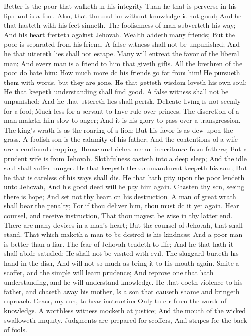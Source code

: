 Better is the poor that walketh in his integrity Than he that is perverse in his lips and is a fool.  Also, that the soul be without knowledge is not good; And he that hasteth with his feet sinneth.  The foolishness of man subverteth his way; And his heart fretteth against Jehovah.  Wealth addeth many friends; But the poor is separated from his friend.  A false witness shall not be unpunished; And he that uttereth lies shall not escape.  Many will entreat the favor of the liberal man; And every man is a friend to him that giveth gifts.  All the brethren of the poor do hate him: How much more do his friends go far from him! He pursueth them with words, but they are gone.  He that getteth wisdom loveth his own soul: He that keepeth understanding shall find good.  A false witness shall not be unpunished; And he that uttereth lies shall perish.  Delicate living is not seemly for a fool; Much less for a servant to have rule over princes.  The discretion of a man maketh him slow to anger; And it is his glory to pass over a transgression.  The king’s wrath is as the roaring of a lion; But his favor is as dew upon the grass.  A foolish son is the calamity of his father; And the contentions of a wife are a continual dropping.  House and riches are an inheritance from fathers; But a prudent wife is from Jehovah.  Slothfulness casteth into a deep sleep; And the idle soul shall suffer hunger.  He that keepeth the commandment keepeth his soul; But he that is careless of his ways shall die.  He that hath pity upon the poor lendeth unto Jehovah, And his good deed will he pay him again.  Chasten thy son, seeing there is hope; And set not thy heart on his destruction.  A man of great wrath shall bear the penalty; For if thou deliver him, thou must do it yet again.  Hear counsel, and receive instruction, That thou mayest be wise in thy latter end.  There are many devices in a man’s heart; But the counsel of Jehovah, that shall stand.  That which maketh a man to be desired is his kindness; And a poor man is better than a liar.  The fear of Jehovah tendeth to life; And he that hath it shall abide satisfied; He shall not be visited with evil.  The sluggard burieth his hand in the dish, And will not so much as bring it to his mouth again.  Smite a scoffer, and the simple will learn prudence; And reprove one that hath understanding, and he will understand knowledge.  He that doeth violence to his father, and chaseth away his mother, Is a son that causeth shame and bringeth reproach.  Cease, my son, to hear instruction Only to err from the words of knowledge.  A worthless witness mocketh at justice; And the mouth of the wicked swalloweth iniquity.  Judgments are prepared for scoffers, And stripes for the back of fools. 

